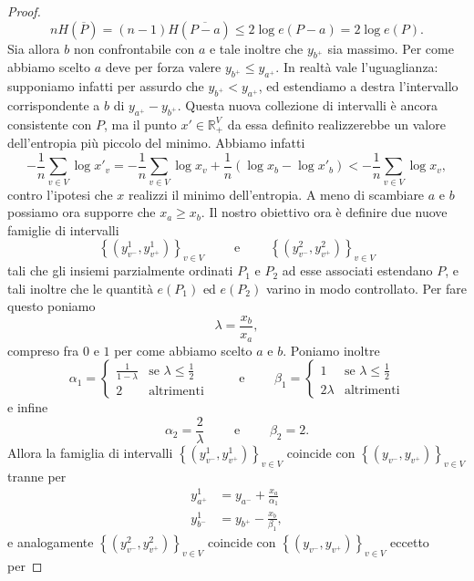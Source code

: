 {\begin{proof}
	\[nH\left(\overline{P}\right)=(n-1)H\left(\overline{P-a}\right)\le 2\log{e(P-a)=2\log{e(P)}}.\]
	Sia allora \(b\) non confrontabile con \(a\) e tale inoltre che \(y_{b^+}\) sia massimo. Per come abbiamo scelto \(a\) deve per forza valere \(y_{b^+}\le y_{a^+}\). In realtà vale l'uguaglianza: supponiamo infatti per assurdo che \(y_{b^+}<y_{a^+}\), ed estendiamo a destra l'intervallo corrispondente a \(b\) di \(y_{a^+}-y_{b^+}\). Questa nuova collezione di intervalli è ancora consistente con \(P\), ma il punto \(x'\in \mathbb{R}_{+}^{V}\) da essa definito realizzerebbe un valore dell'entropia più piccolo del minimo. Abbiamo infatti
	\[-\frac{1}{n}\sum_{v\in V}{\log{x'_{v}}}=-\frac{1}{n}\sum_{v\in V}{\log{x_{v}}}+\frac{1}{n}\left(\log{x_b}-\log{x'_{b}}\right)<-\frac{1}{n}\sum_{v\in V}{\log{x_v}},\]
	contro l'ipotesi che \(x\) realizzi il minimo dell'entropia. A meno di scambiare \(a\) e \(b\) possiamo ora supporre che \(x_a\ge x_b\). Il nostro obiettivo ora è definire due nuove famiglie di intervalli
	\[\left\{\left(y_{v^-}^1, y_{v^+}^1\right)\right\}_{v\in V}\qquad\mbox{ e }\qquad\left\{\left(y_{v^-}^2, y_{v^+}^2\right)\right\}_{v\in V}\]
	tali che gli insiemi parzialmente ordinati \(P_1\) e \(P_2\) ad esse associati estendano \(P\), e tali inoltre che le quantità \(e(P_1)\) ed \(e(P_2)\) varino in modo controllato. Per fare questo poniamo
	\[\lambda=\frac{x_b}{x_a},\]
	compreso fra \(0\) e \(1\) per come abbiamo scelto \(a\) e \(b\). Poniamo inoltre
	\[\alpha_1= 
	\begin{cases}
		\frac{1}{1-\lambda} & \mbox{se } \lambda\le\frac{1}{2} \\
		2 & \mbox{altrimenti} 
	\end{cases}
	\qquad\mbox{ e }\qquad \beta_1= 
	\begin{cases}
		1 & \mbox{se } \lambda\le\frac{1}{2} \\
		2\lambda & \mbox{altrimenti} 
	\end{cases}
	\]
	e infine
	\[\alpha_2=\frac{2}{\lambda}\qquad\mbox{ e }\qquad\beta_2=2.\]
	Allora la famiglia di intervalli \(\left\{\left(y_{v^-}^1, y_{v^+}^1\right)\right\}_{v\in V}\) coincide con \(\left\{\left(y_{v^-}, y_{v^+}\right)\right\}_{v\in V}\) tranne per 
	\begin{align}
		y_{a^+}^1 &= y_{a^-} + \frac{x_a}{\alpha_1} \nonumber \\
		y_{b^-}^1 &= y_{b^+} - \frac{x_b}{\beta_1}, \nonumber 
	\end{align}
	e analogamente \(\left\{\left(y_{v^-}^2, y_{v^+}^2\right)\right\}_{v\in V}\) coincide con \(\left\{\left(y_{v^-}, y_{v^+}\right)\right\}_{v\in V}\) eccetto per 

\end{proof}}

